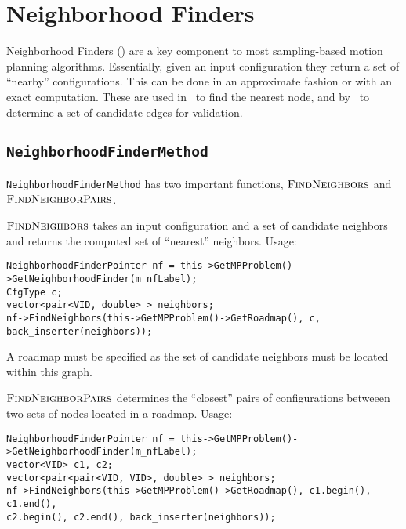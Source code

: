 \chapter{Neighborhood Finders}

Neighborhood Finders (\nf) are a key component to most sampling-based motion
planning algorithms. Essentially, given an input configuration they return a set
of ``nearby'' configurations. This can be done in an approximate fashion or with
an exact computation. These are used in \rrts\ to find the nearest node, and by
\prms\ to determine a set of candidate edges for validation.

\section{\texttt{NeighborhoodFinderMethod}}

\texttt{NeighborhoodFinderMethod} has two important functions,
$\textsc{FindNeighbors}$ and $\textsc{FindNeighborPairs}$.

$\textsc{FindNeighbors}$ takes an input configuration and a set of candidate
neighbors and returns the computed set of ``nearest'' neighbors. Usage:
\begin{lstlisting}
NeighborhoodFinderPointer nf = this->GetMPProblem()->GetNeighborhoodFinder(m_nfLabel);
CfgType c;
vector<pair<VID, double> > neighbors;
nf->FindNeighbors(this->GetMPProblem()->GetRoadmap(), c, back_inserter(neighbors));
\end{lstlisting}
A roadmap must be specified as the set of candidate neighbors must be located
within this graph.

$\textsc{FindNeighborPairs}$ determines the ``closest'' pairs of configurations
betweeen two sets of nodes located in a roadmap. Usage:
\begin{lstlisting}
NeighborhoodFinderPointer nf = this->GetMPProblem()->GetNeighborhoodFinder(m_nfLabel);
vector<VID> c1, c2;
vector<pair<pair<VID, VID>, double> > neighbors;
nf->FindNeighbors(this->GetMPProblem()->GetRoadmap(), c1.begin(), c1.end(),
c2.begin(), c2.end(), back_inserter(neighbors));
\end{lstlisting}

